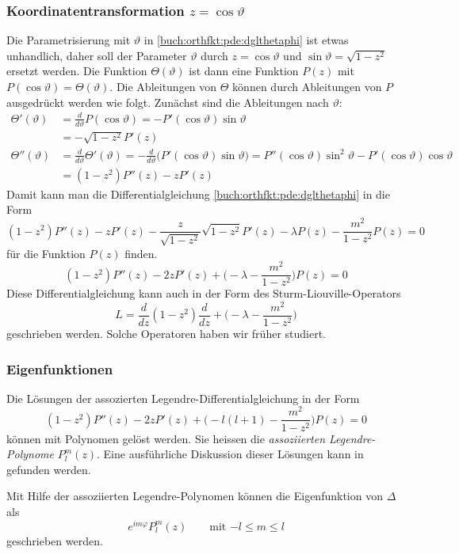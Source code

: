 \subsubsection{Koordinatentransformation $z=\cos\vartheta$}
Die Parametrisierung mit $\vartheta$
in \eqref{buch:orthfkt:pde:dglthetaphi}
ist etwas unhandlich, daher soll der Parameter
$\vartheta$ durch $z=\cos\vartheta$ und
$\sin\vartheta = \!\sqrt{1-z^2}$
ersetzt werden.
Die Funktion $\Theta(\vartheta)$ ist dann eine Funktion $P(z)$ mit
$P(\cos\vartheta)=\Theta(\vartheta)$.
Die Ableitungen von $\Theta$ können durch Ableitungen von $P$
ausgedrückt werden wie folgt.
Zunächst sind die Ableitungen nach $\vartheta$:
\begin{align*}
\Theta'(\vartheta)
&=
\frac{d}{d\vartheta} P(\cos\vartheta)
=
-P'(\cos\vartheta) \sin\vartheta
\\
&=
-
\!\sqrt{1-z^2}
P'(z)
\\
\Theta''(\vartheta)
&=
\frac{d}{d\vartheta} 
\Theta'(\vartheta)
=
-\frac{d}{d\vartheta}\bigl(P'(\cos\vartheta) \sin\vartheta\bigr)
=
P''(\cos\vartheta)\sin^2\vartheta
-
P'(\cos\vartheta)\cos\vartheta
\\
&=
(1-z^2)
P''(z)
-
z
P'(z)
\end{align*}
Damit kann man die Differentialgleichung
\eqref{buch:orthfkt:pde:dglthetaphi}
in die Form
\[
(1-z^2)P''(z)
-
zP'(z)
-
\frac{z}{\!\sqrt{1-z^2}}\!\sqrt{1-z^2}P'(z)
-
\lambda P(z)
-
\frac{m^2}{1-z^2}P(z)
=
0
\]
für die Funktion $P(z)$ finden.
\begin{equation}
(1-z^2)P''(z) - 2zP'(z)
+
\biggl(
-
\lambda
-
\frac{m^2}{1-z^2}
\biggr)
P(z)
=
0
\label{buch:orthofkt:pde:eqn:legendreassocz}
\end{equation}
Diese Differentialgleichung kann auch in der Form des
Sturm-Liouville-Operators
\[
L
=
\frac{d}{dz}
(1-z^2)
\frac{d}{dz}
+
\biggl(-\lambda-\frac{m^2}{1-z^2}\biggr)
\]
geschrieben werden.
Solche Operatoren haben wir früher studiert.

%
%
\subsubsection{Eigenfunktionen}
Die Lösungen der assozierten Legendre-Differentialgleichung
in der Form 
\[
(1-z^2)P''(z)
-2z P'(z) +
\biggl(
-l(l+1)-\frac{m^2}{1-z^2}
\biggr)P(z)
=
0
\]
können mit Polynomen gelöst werden.
Sie heissen die {\em assoziierten Legendre-Polynome} $P_l^m(z)$.
Eine ausführliche Diskussion dieser Lösungen kann in
\cite{buch:mathsem-spezfunk}
gefunden werden.

Mit Hilfe der assoziierten Legendre-Polynomen können die Eigenfunktion
von $\Delta$ als
\[
e^{im\varphi}
P_l^m(z)
\qquad\text{mit $-l\le m\le l$}
\]
geschrieben werden.



